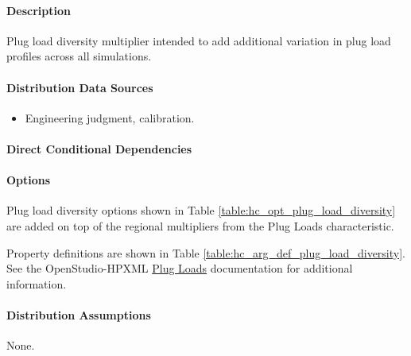 \paragraph{Description}
% 
Plug load diversity multiplier intended to add additional variation in plug load profiles across all simulations.

\paragraph{Distribution Data Sources}
% 
\begin{itemize}
 
\item
  Engineering judgment, calibration.
\end{itemize}

\paragraph{Direct Conditional Dependencies}


\paragraph{Options}
Plug load diversity options shown in Table \ref{table:hc_opt_plug_load_diversity} are added on top of the regional multipliers from the Plug Loads characteristic.



Property definitions are shown in Table \ref{table:hc_arg_def_plug_load_diversity}. See the OpenStudio-HPXML \href{https://openstudio-hpxml.readthedocs.io/en/v1.10.0/workflow_inputs.html#hpxml-plug-loads}{Plug Loads} documentation for additional information.



\paragraph{Distribution Assumptions}
% 
None.
